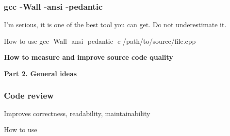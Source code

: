 \documentclass{beamer}
\begin{document}
\begin{frame}
\frametitle{gcc -Wall -ansi -pedantic}
I'm serious, it is one of the best tool you can get. Do not underestimate it.
\begin{exampleblock}{How to use}
gcc -Wall -ansi -pedantic -c /path/to/source/file.cpp
\end{exampleblock}
\end{frame}

\begin{frame}
\begin{block}{\begin{center}\Large\textbf{How to measure and improve source code quality}\end{center}}
\begin{center}
\textbf{Part 2. General ideas}
\end{center}
\end{block}
\end{frame}

\begin{frame}
\frametitle{Code review}
Improves correctness, readability, maintainability
\begin{exampleblock}{How to use}
\end{exampleblock}
\end{frame}
\end{document}
